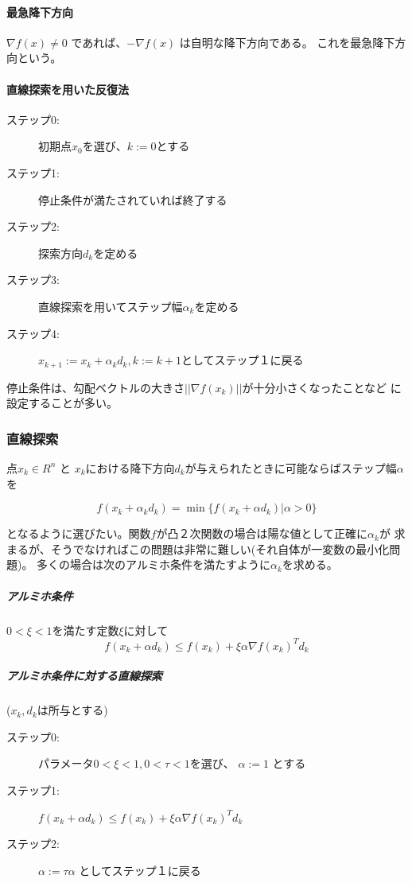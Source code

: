 \documentclass{jsarticle}
\begin{document}
\paragraph{最急降下方向}
$\nabla f(x) \neq 0$ であれば、$-\nabla f(x)$ は自明な降下方向である。
これを最急降下方向という。

\paragraph{直線探索を用いた反復法}

\begin{description}
  \item[ステップ0:] 初期点$x_0$を選び、$k := 0$とする
  \item[ステップ1:] 停止条件が満たされていれば終了する
  \item[ステップ2:] 探索方向$d_k$を定める
  \item[ステップ3:] 直線探索を用いてステップ幅${\alpha}_k$を定める
  \item[ステップ4:] $x_{k+1} := x_{k} + {\alpha}_kd_k, k := k + 1$としてステップ１に戻る
\end{description}

停止条件は、勾配ベクトルの大きさ$||\nabla f(x_k)||$が十分小さくなったことなど
に設定することが多い。

\subsubsection{直線探索}
点$x_k \in R^n$ と $x_k$における降下方向$d_k$が与えられたときに可能ならばステップ幅${\alpha}$を

$$
f(x_k + {\alpha}_kd_k) = \min \{f(x_k + \alpha d_k)  | \alpha > 0\}
$$

となるように選びたい。関数$f$が凸２次関数の場合は陽な値として正確に${\alpha}_k$が
求まるが、そうでなければこの問題は非常に難しい(それ自体が一変数の最小化問題)。
多くの場合は次のアルミホ条件を満たすように${\alpha}_k$を求める。\\

\subparagraph{アルミホ条件}
$0 < \xi < 1$を満たす定数$\xi$に対して
$$
f(x_k + \alpha d_k) \leq f(x_k) + \xi \alpha \nabla f(x_k)^Td_k
$$

\subparagraph{アルミホ条件に対する直線探索}
($x_k, d_k$は所与とする)
\begin{description}
  \item[ステップ0:] パラメータ$0 < \xi < 1, 0 < \tau < 1$を選び、 $\alpha := 1$ とする
  \item[ステップ1:] $f(x_k + \alpha d_k) \leq f(x_k) + \xi \alpha \nabla f(x_k)^Td_k$
  \item[ステップ2:] $\alpha := \tau \alpha$ としてステップ１に戻る
\end{description}
\end{document}
